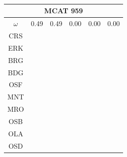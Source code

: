 \documentclass[12pt]{article}
\begin{document}
\begin{landscape}
\begin{figure}
{\begin{minipage}[c]{0.3\textwidth}
\begin{tabular}{|c|c|c|c|c|c|}
\end{tabular}\\$~$\\$~$\\                                                                                                                                  
\begin{tabular}{|c|c|c|c|c|c|}                                                                                                                           
         \hline \multicolumn{6}{|c|}{MCAT 959} \\ \hline                                                                                                 
         $\omega$&0.49&0.49&0.00&0.00&0.00 \\ \hline                                                                                                     
        CRS&\cellcolor[HTML]{E41A1C}&\cellcolor[HTML]{E41A1C}&\cellcolor[HTML]{E41A1C}&\cellcolor[HTML]{E41A1C}&\cellcolor[HTML]{E41A1C} \\ \hline
        ERK&\cellcolor[HTML]{E41A1C}&\cellcolor[HTML]{E41A1C}&\cellcolor[HTML]{377EB8}&\cellcolor[HTML]{E41A1C}&\cellcolor[HTML]{E41A1C} \\ \hline
        BRG&\cellcolor[HTML]{377EB8}&\cellcolor[HTML]{377EB8}&\cellcolor[HTML]{377EB8}&\cellcolor[HTML]{E41A1C}&\cellcolor[HTML]{E41A1C} \\ \hline
        BDG&\cellcolor[HTML]{377EB8}&\cellcolor[HTML]{4DAF4A}&\cellcolor[HTML]{377EB8}&\cellcolor[HTML]{377EB8}&\cellcolor[HTML]{377EB8} \\ \hline
        OSF&\cellcolor[HTML]{4DAF4A}&\cellcolor[HTML]{4DAF4A}&\cellcolor[HTML]{4DAF4A}&\cellcolor[HTML]{4DAF4A}&\cellcolor[HTML]{377EB8} \\ \hline
        MNT&\cellcolor[HTML]{984EA3}&\cellcolor[HTML]{984EA3}&\cellcolor[HTML]{984EA3}&\cellcolor[HTML]{4DAF4A}&\cellcolor[HTML]{4DAF4A} \\ \hline
        MRO&\cellcolor[HTML]{FF7F00}&\cellcolor[HTML]{984EA3}&\cellcolor[HTML]{984EA3}&\cellcolor[HTML]{4DAF4A}&\cellcolor[HTML]{4DAF4A} \\ \hline
        OSB&\cellcolor[HTML]{FF7F00}&\cellcolor[HTML]{984EA3}&\cellcolor[HTML]{984EA3}&\cellcolor[HTML]{984EA3}&\cellcolor[HTML]{4DAF4A} \\ \hline
        OLA&\cellcolor[HTML]{FF7F00}&\cellcolor[HTML]{FF7F00}&\cellcolor[HTML]{FF7F00}&\cellcolor[HTML]{984EA3}&\cellcolor[HTML]{984EA3} \\ \hline
        OSD&\cellcolor[HTML]{FFFF33}&\cellcolor[HTML]{FFFF33}&\cellcolor[HTML]{FFFF33}&\cellcolor[HTML]{984EA3}&\cellcolor[HTML]{984EA3} \\ \hline

\end{tabular}
\end{minipage}}
\end{figure}
\end{landscape}
\end{document}
